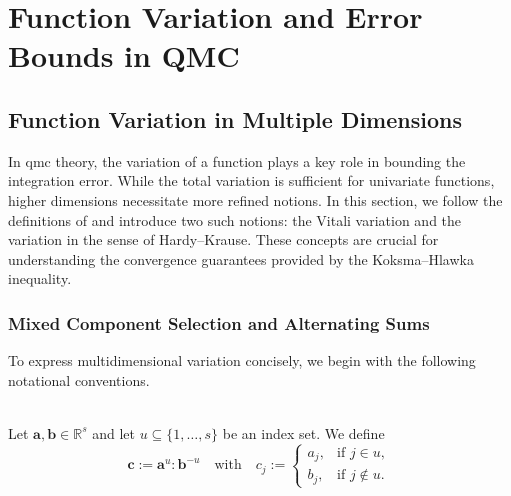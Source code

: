 \chapter{Function Variation and Error Bounds in QMC}
\label{chapter3}
\section{Function Variation in Multiple Dimensions}

In \acf{qmc} theory, the variation of a function plays a key role in bounding
the integration error. While the total variation is sufficient for univariate
functions, higher dimensions necessitate more refined notions. In this section,
we follow the definitions of \cite{owen2005multidimensional} and introduce two
such notions: the Vitali variation and the variation in the sense of
Hardy--Krause. These concepts are crucial for understanding the convergence
guarantees provided by the Koksma--Hlawka inequality.

\subsection{Mixed Component Selection and Alternating Sums}

To express multidimensional variation concisely, we begin with the following
notational conventions.

\begin{definition} \ \\
    \label{def:component_merge}
    Let $\boldsymbol{a}, \boldsymbol{b} \in \mathbb{R}^s$ and let $u \subseteq
    \{1, \dots, s\}$ be an index set. We define
    \begin{equation*}
        \boldsymbol{c} := \boldsymbol{a}^u : \boldsymbol{b}^{-u}
        \quad \text{with} \quad
        c_j := 
        \begin{cases}
            a_j, & \text{if } j \in u, \\
            b_j, & \text{if } j \notin u.
        \end{cases}
    \end{equation*}
\end{definition}

